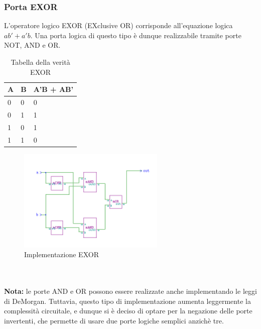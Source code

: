 \documentclass[10pt]{article}
\begin{document}
\begin{itemize}
\subsubsection{Porta EXOR}
L'operatore logico EXOR (EXclusive OR) corrisponde all'equazione logica $ab' + a'b$. Una porta logica di questo tipo è dunque realizzabile tramite porte NOT, AND e OR.

\begin{table}[H]
    \begin{minipage}[b]{0.4\textwidth}
    \centering
    \begin{tabular}{|ll|l|}
        \hline
        \textbf{A} & \textbf{B} & \textbf{A'B + AB'} \\ \hline
        0          & 0          & 0          \\ \hline
        0          & 1          & 1          \\ 
        1          & 0          & 1          \\
        1          & 1          & 0          \\ \hline
        \end{tabular}
        \caption{Tabella della verità EXOR}
        \label{table:student}
    \end{minipage}
    \end{table}
    
    \begin{figure}[ht]
    \begin{minipage}[b]{0.4\textwidth}
    
    \includegraphics[width=70mm]{exor}
    \caption{Implementazione EXOR}
    \label{ }
    \end{minipage}
    \end{figure}

\\
\\
\textbf{Nota:} le porte AND e OR possono essere realizzate anche implementando le leggi di DeMorgan. Tuttavia, questo tipo di implementazione aumenta leggermente la complessità circuitale, e dunque
si è deciso di optare per la negazione delle porte invertenti, che permette di usare due porte logiche semplici anzichè tre.


\end{itemize}
\end{document}
